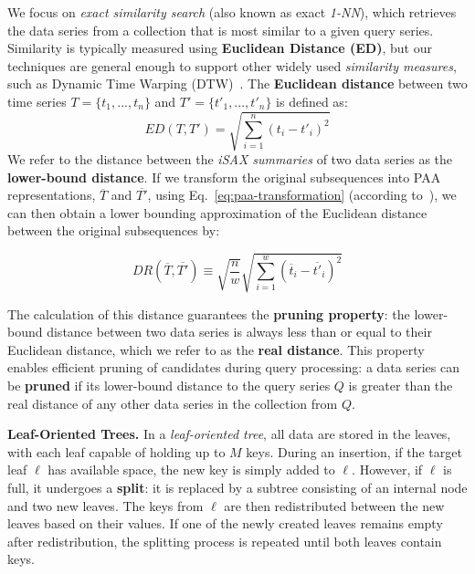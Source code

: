We focus on \textit{exact similarity search} (also known as exact \textit{1-NN}),  
which retrieves the data series from a collection that is most similar to a given 
query series. Similarity is typically measured using \textbf{Euclidean Distance (ED)},
but our techniques are general enough to support other widely used 
\textit{similarity measures}, such as Dynamic Time Warping (DTW)~\cite{rakthanmanon2012searching}.  
% 
The \textbf{Euclidean distance} between two time series  
\( T = \{t_1, ... , t_n\} \) and \( T' = \{t'_1, ... , t'_n\} \)  
is defined as:  
\begin{equation}
ED(T, T') = \sqrt{\sum_{i=1}^{n} (t_i - t'_i)^2}
\label{eq:Euclidean-distance}
\end{equation} 
% 
We refer to the distance between the \textit{iSAX summaries} of two data series  
as the \textbf{lower-bound distance}. If we transform the original subsequences into PAA
representations, $\overline{T}$ and $\overline{T'}$, using Eq.~\ref{eq:paa-transformation}
(according to~\cite{Lin2007SAX}),
we can then obtain a lower bounding approximation of the Euclidean distance
between the original subsequences by:

\begin{equation}
DR(\overline{T}, \overline{T'}) \equiv \sqrt{\frac{n}{w}} \sqrt{\sum_{i=1}^{w} (\overline{t}_{i} - \overline{t'}_{i})^2}
\label{eq:lower-bound-distance}
\end{equation}

% 
The calculation of this distance guarantees the \textbf{pruning property}:  
the lower-bound distance between two data series is always less than or equal to  
their Euclidean distance, which we refer to as the \textbf{real distance}.  
% 
This property enables efficient pruning of candidates during query processing:  
a data series can be \textbf{pruned} if its lower-bound distance to the query series
\( Q \) is greater than the real distance of any other data series in the collection 
from \( Q \).

\noindent
{\bf Leaf-Oriented Trees.}  
In a \textit{leaf-oriented tree}, all data are stored in the leaves, with each leaf
capable of holding up to \( M \) keys.  
% 
During an insertion, if the target leaf \( \ell \) has available space,  
the new key is simply added to \( \ell \).  
However, if \( \ell \) is full, it undergoes a \textbf{split}: it is replaced 
by a subtree consisting of an internal node and two new leaves.  
The keys from \( \ell \) are then redistributed between the new leaves based on
their values.  
% 
If one of the newly created leaves remains empty after redistribution,  
the splitting process is repeated until both leaves contain keys.  

